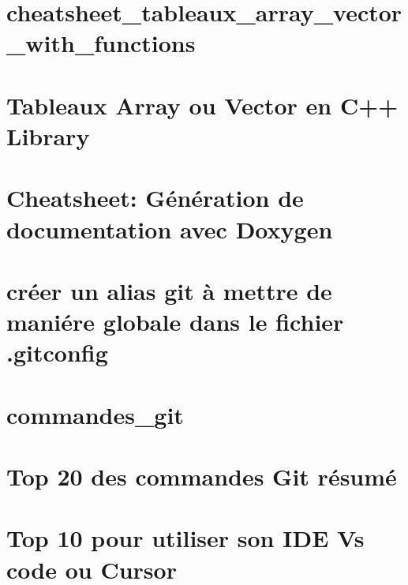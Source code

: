 \documentclass[twoside]{book}
\newcommand{\+}{\discretionary{\mbox{\scriptsize$\hookleftarrow$}}{}{}}
\begin{document}
\chapter{cheatsheet\+\_\+tableaux\+\_\+array\+\_\+vector\+\_\+with\+\_\+functions}
\label{md_base_connaissances_Cpp_cheatsheet_cheatsheet_tableaux_array_vector_with_functions}

\chapter{Tableaux Array ou Vector en C++ Library}
\label{md_base_connaissances_Cpp_cheatsheet_cheatsheet_tableaux_arrays_vectors}

\chapter{Cheatsheet\+: Génération de documentation avec Doxygen}
\label{md_base_connaissances_Cpp_cheatsheet_Doxygen_Cheatsheet}

\chapter{créer un alias git à mettre de maniére globale dans le fichier .gitconfig}
\label{md_base_connaissances_Git_alias_git}

\chapter{commandes\+\_\+git}
\label{md_base_connaissances_Git_commandes_git}

\chapter{Top 20 des commandes Git résumé}
\label{md_base_connaissances_Git_top_20_git}

\chapter{Top 10 pour utiliser son I\+DE Vs code ou Cursor}
\label{md_base_connaissances_ide_top_10_ide}

\end{document}
